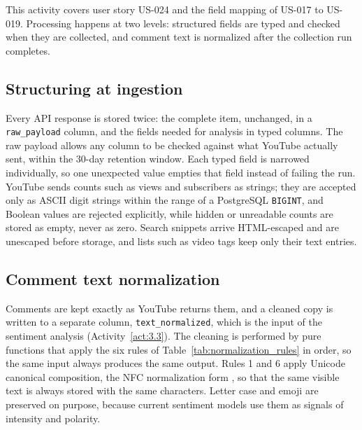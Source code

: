 This activity covers user story US-024 and the field mapping of US-017 to US-019. Processing happens at two levels: structured fields are typed and checked when they are collected, and comment text is normalized after the collection run completes.

\subsection{Structuring at ingestion}

Every API response is stored twice: the complete item, unchanged, in a \texttt{raw\_\allowbreak payload} column, and the fields needed for analysis in typed columns. The raw payload allows any column to be checked against what YouTube actually sent, within the 30-day retention window. Each typed field is narrowed individually, so one unexpected value empties that field instead of failing the run. YouTube sends counts such as views and subscribers as strings; they are accepted only as ASCII digit strings within the range of a PostgreSQL \texttt{BIGINT}, and Boolean values are rejected explicitly, while hidden or unreadable counts are stored as empty, never as zero. Search snippets arrive HTML-escaped and are unescaped before storage, and lists such as video tags keep only their text entries.

\subsection{Comment text normalization}

Comments are kept exactly as YouTube returns them, and a cleaned copy is written to a separate column, \texttt{text\_\allowbreak normalized}, which is the input of the sentiment analysis (Activity~\ref{act:3.3}). The cleaning is performed by pure functions that apply the six rules of Table~\ref{tab:normalization_rules} in order, so the same input always produces the same output. Rules 1 and 6 apply Unicode canonical composition, the NFC normalization form \autocite{unicode_normalization_forms}, so that the same visible text is always stored with the same characters. Letter case and emoji are preserved on purpose, because current sentiment models use them as signals of intensity and polarity.

